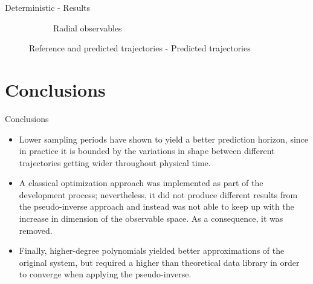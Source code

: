 \documentclass{beamer}
\begin{document}
\begin{frame}{Deterministic - Results}
\begin{figure}
\begin{subfigure}[b]{0.45\textwidth}
            \caption{Radial observables}
            \label{fig:verification_radial}
        \end{subfigure}
        \caption{Reference and predicted trajectories - Predicted trajectories}
    \end{figure}
\end{frame}


\section{Conclusions}

\begin{frame}{Conclusions}
    \begin{itemize}
        \item Lower sampling periods have shown to yield a better prediction horizon, since in practice it is bounded by the variations in shape between different trajectories getting wider throughout physical time.
        \item A classical optimization approach was implemented as part of the development process; nevertheless, it did not produce different results from the pseudo-inverse approach and instead was not able to keep up with the increase in dimension of the observable space. As a consequence, it was removed.
        \item Finally, higher-degree polynomials yielded better approximations of the original system, but required a higher than theoretical data library in order to converge when applying the pseudo-inverse.
    \end{itemize}
\end{frame}
\end{document}
